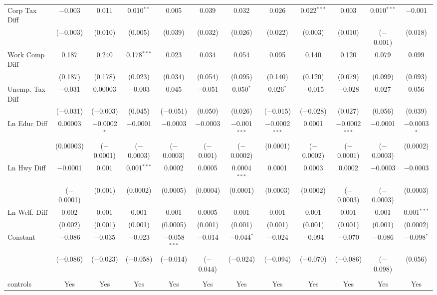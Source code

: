 \begin{table}[!htbp]
\begin{tabular}{@{\extracolsep{5pt}}lccccccccccc}
  Corp Tax Diff & $-$0.003 & 0.011 & 0.010$^{**}$ & 0.005 & 0.039 & 0.032 & 0.026 & 0.022$^{***}$ & 0.003 & 0.010$^{***}$ & $-$0.001 \\ 
  & ($-$0.003) & (0.010) & (0.005) & (0.039) & (0.032) & (0.026) & (0.022) & (0.003) & (0.010) & ($-$0.001) & (0.018) \\ 
  Work Comp Diff & 0.187 & 0.240 & 0.178$^{***}$ & 0.023 & 0.034 & 0.054 & 0.095 & 0.140 & 0.120 & 0.079 & 0.099 \\ 
  & (0.187) & (0.178) & (0.023) & (0.034) & (0.054) & (0.095) & (0.140) & (0.120) & (0.079) & (0.099) & (0.093) \\ 
  Unemp. Tax Diff & $-$0.031 & 0.00003 & $-$0.003 & 0.045 & $-$0.051 & 0.050$^{*}$ & 0.026$^{*}$ & $-$0.015 & $-$0.028 & 0.027 & 0.056 \\ 
  & ($-$0.031) & ($-$0.003) & (0.045) & ($-$0.051) & (0.050) & (0.026) & ($-$0.015) & ($-$0.028) & (0.027) & (0.056) & (0.039) \\ 
  Ln Educ Diff & 0.00003 & $-$0.0002$^{*}$ & $-$0.0001 & $-$0.0003 & $-$0.0003 & $-$0.001$^{***}$ & $-$0.0002$^{***}$ & 0.0001 & $-$0.0002$^{***}$ & $-$0.0001 & $-$0.0003$^{*}$ \\ 
  & (0.00003) & ($-$0.0001) & ($-$0.0003) & ($-$0.0003) & ($-$0.001) & ($-$0.0002) & (0.0001) & ($-$0.0002) & ($-$0.0001) & ($-$0.0003) & (0.0002) \\ 
  Ln Hwy Diff & $-$0.0001 & 0.001 & 0.001$^{***}$ & 0.0002 & 0.0005 & 0.0004$^{***}$ & 0.0001 & 0.0003 & 0.0002 & $-$0.0003 & $-$0.0003 \\ 
  & ($-$0.0001) & (0.001) & (0.0002) & (0.0005) & (0.0004) & (0.0001) & (0.0003) & (0.0002) & ($-$0.0003) & ($-$0.0003) & (0.0003) \\ 
  Ln Welf. Diff & 0.002 & 0.001 & 0.001 & 0.001 & 0.0005 & 0.001 & 0.001 & 0.001 & 0.001 & 0.001 & 0.001$^{***}$ \\ 
  & (0.002) & (0.001) & (0.001) & (0.0005) & (0.001) & (0.001) & (0.001) & (0.001) & (0.001) & (0.001) & (0.0002) \\ 
  Constant & $-$0.086 & $-$0.035 & $-$0.023 & $-$0.058$^{***}$ & $-$0.014 & $-$0.044$^{*}$ & $-$0.024 & $-$0.094 & $-$0.070 & $-$0.086 & $-$0.098$^{*}$ \\ 
  & ($-$0.086) & ($-$0.023) & ($-$0.058) & ($-$0.014) & ($-$0.044) & ($-$0.024) & ($-$0.094) & ($-$0.070) & ($-$0.086) & ($-$0.098) & (0.056) \\ 
 \hline \\[-1.8ex] 
controls & Yes & Yes & Yes & Yes & Yes & Yes & Yes & Yes & Yes & Yes & Yes \\ 

\end{tabular}
\end{table}
